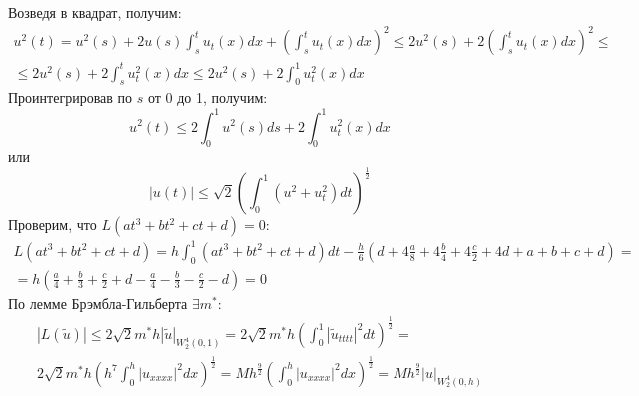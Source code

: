 \documentclass[11pt]{article}
\begin{document}
Возведя в квадрат, получим:
\begin{multline*}
u^2(t) = u^2(s) + 2u(s)\int_s^tu_t(x)dx + \left(\int_s^tu_t(x)dx\right)^2 \leq 2u^2(s) + 2\left(\int_s^tu_t(x)dx\right)^2 \leq \\
\leq 2u^2(s) + 2\int_s^tu_t^2(x)dx \leq 2u^2(s) + 2\int_0^1u_t^2(x)dx
\end{multline*}
Проинтегрировав по $s$ от 0 до 1, получим:
\begin{equation*}
u^2(t) \leq 2\int_0^1u^2(s)ds + 2\int_0^1u_t^2(x)dx
\end{equation*}
или
\begin{equation*}
|u(t)| \leq \sqrt{2}\left(\int_0^1(u^2 + u_t^2)dt\right)^{\frac12}
\end{equation*}
Проверим, что $L(at^3 + bt^2 + ct + d) = 0$:
\begin{multline*}
L(at^3 + bt^2 + ct + d) = h\int_0^1(at^3 + bt^2 + ct + d)dt - \frac{h}6\left(d + 4\frac{a}8 + 4\frac{b}4 + 4\frac{c}2 + 4d + a + b + c + d\right) = \\
= h\left(\frac{a}4 + \frac{b}3 + \frac{c}2 + d - \frac{a}4 - \frac{b}3 - \frac{c}2 - d\right) = 0
\end{multline*}
По лемме Брэмбла-Гильберта $\exists m^*$:
\begin{multline}
\label{eq:4}
|L(\widetilde{u})| \leq 2\sqrt{2}m^*h|\widetilde{u}|_{W_2^4(0, 1)} = 2\sqrt{2}m^*h\left(\int_0^1|\widetilde{u}_{tttt}|^2dt\right)^{\frac12} = \\ 2\sqrt{2}m^*h\left(h^7\int_0^{h}|u_{xxxx}|^2dx\right)^{\frac12} = Mh^{\frac92}\left(\int_0^{h}|u_{xxxx}|^2dx\right)^{\frac12} =
Mh^{\frac92}|u|_{W_2^4(0, h)}
\end{multline}
\end{document}
